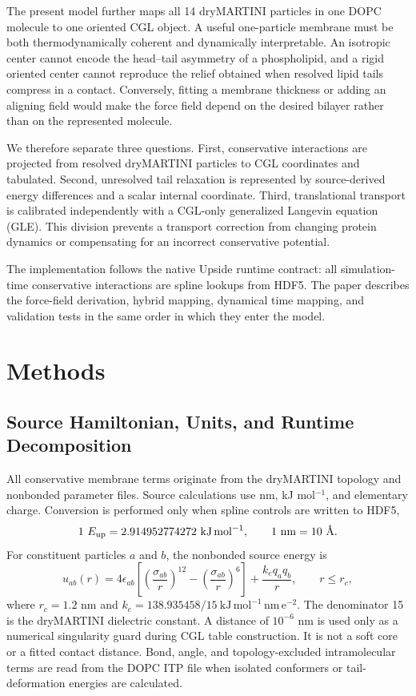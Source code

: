 \documentclass{article}
\newcommand{\angstrom}{\text{\normalfont\AA}}
\begin{document}
The present model further maps all 14 dryMARTINI particles in one DOPC
molecule to one oriented CGL object.  A useful one-particle membrane must be
both thermodynamically coherent and dynamically interpretable.  An isotropic
center cannot encode the head--tail asymmetry of a phospholipid, and a rigid
oriented center cannot reproduce the relief obtained when resolved lipid tails
compress in a contact.  Conversely, fitting a membrane thickness or adding an
aligning field would make the force field depend on the desired bilayer rather
than on the represented molecule.

We therefore separate three questions.  First, conservative interactions are
projected from resolved dryMARTINI particles to CGL coordinates and tabulated.
Second, unresolved tail relaxation is represented by source-derived energy
differences and a scalar internal coordinate.  Third, translational transport
is calibrated independently with a CGL-only generalized Langevin equation
(GLE).  This division prevents a transport correction from changing protein
dynamics or compensating for an incorrect conservative potential.

The implementation follows the native Upside runtime contract: all
simulation-time conservative interactions are spline lookups from HDF5.  The
paper describes the force-field derivation, hybrid mapping, dynamical time
mapping, and validation tests in the same order in which they enter the model.

\section{Methods}

\subsection{Source Hamiltonian, Units, and Runtime Decomposition}

All conservative membrane terms originate from the dryMARTINI topology and
nonbonded parameter files.  Source calculations use nm, kJ mol$^{-1}$, and
elementary charge.  Conversion is performed only when spline controls are
written to HDF5,
\begin{equation}
1~E_{\mathrm{up}}=2.914952774272~\mathrm{kJ\,mol^{-1}},
\qquad 1~\mathrm{nm}=10~\angstrom .
\label{eq:units}
\end{equation}
For constituent particles $a$ and $b$, the nonbonded source energy is
\begin{equation}
u_{ab}(r)=4\epsilon_{ab}
\left[\left(\frac{\sigma_{ab}}{r}\right)^{12}
-\left(\frac{\sigma_{ab}}{r}\right)^6\right]
+\frac{k_e q_aq_b}{r},\qquad r\leq r_c,
\label{eq:source_pair}
\end{equation}
where $r_c=1.2$ nm and
$k_e=138.935458/15~\mathrm{kJ\,mol^{-1}\,nm\,e^{-2}}$.  The denominator 15 is
the dryMARTINI dielectric constant.  A distance of $10^{-6}$ nm is used only
as a numerical singularity guard during CGL table construction.  It is not a
soft core or a fitted contact distance.  Bond, angle, and topology-excluded
intramolecular terms are read from the DOPC ITP file when isolated conformers
or tail-deformation energies are calculated.
\end{document}
